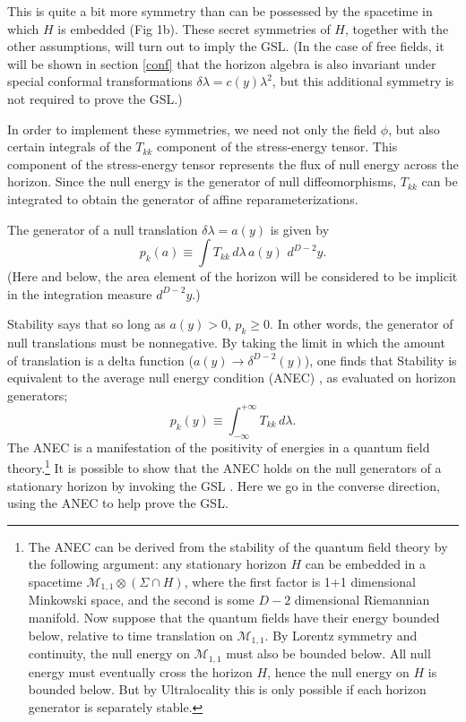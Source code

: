 \documentclass[12pt]{article}
\begin{document}
This is quite a bit more symmetry than can be possessed by the spacetime in which $H$ is embedded (Fig 1b).  These secret symmetries of $H$, together with the other assumptions, will turn out to imply the GSL.  (In the case of free fields, it will be shown in section \ref{conf} that the horizon algebra is also invariant under special conformal transformations $\delta \lambda = c(y) \lambda^2$, but this additional symmetry is not required to prove the GSL.)

In order to implement these symmetries, we need not only the field $\phi$, but also certain integrals of the $T_{kk}$ component of the stress-energy tensor.  This component of the stress-energy tensor represents the flux of null energy across the horizon.  Since the null energy is the generator of null diffeomorphisms, $T_{kk}$ can be integrated to obtain the generator of affine reparameterizations.

The generator of a null translation $\delta \lambda = a(y)$ is given by
\begin{equation}\label{pka}
p_k(a) \equiv \int T_{kk}\,d\lambda\,a(y)\,\,d^{D-2}y.
\end{equation}
(Here and below, the area element of the horizon will be considered to be implicit in the integration measure $d^{D-2}y$.)

Stability says that so long as $a(y) > 0$, $p_k \ge 0$.  In other words, the generator of null translations must be nonnegative.  By taking the limit in which the amount of translation is a delta function ($a(y) \to \delta^{D-2}(y)$), one finds that Stability is equivalent to the average null energy condition (ANEC) \cite{borde87}, as evaluated on horizon generators;
\begin{equation}
p_k(y) \equiv \int_{-\infty}^{+\infty} T_{kk}\,d\lambda.
\end{equation}
The ANEC is a manifestation of the positivity of energies in a quantum field theory.\footnote{The ANEC can be derived from the stability of the quantum field theory by the following argument: any stationary horizon $H$ can be embedded in a spacetime $\mathcal{M}_{1,1} \otimes (\Sigma \cap H)$, where the first factor is 1+1 dimensional Minkowski space, and the second is some $D-2$ dimensional Riemannian manifold.  Now suppose that the quantum fields have their energy bounded below, relative to time translation on $\mathcal{M}_{1,1}$.  By Lorentz symmetry and continuity, the null energy on $\mathcal{M}_{1,1}$ must also be bounded below.  All null energy must eventually cross the horizon $H$, hence the null energy on $H$ is bounded below.  But by Ultralocality this is only possible if each horizon generator is separately stable.}   It is possible to show that the ANEC holds on the null generators of a stationary horizon by invoking the GSL \cite{anec}.  Here we go in the converse direction, using the ANEC to help prove the GSL.
\end{document}
